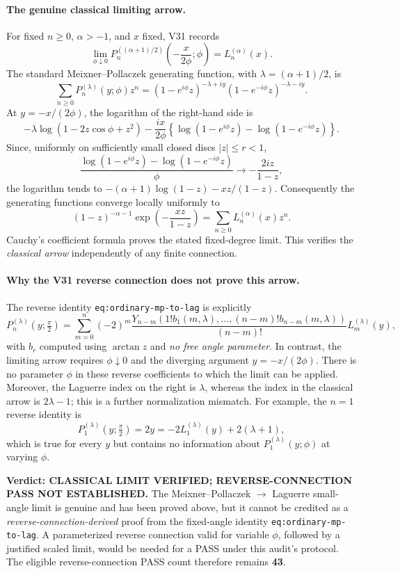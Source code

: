 \documentclass[11pt]{article}
\begin{document}
\paragraph{The genuine classical limiting arrow.}
For fixed $n\ge0$, $\alpha>-1$, and $x$ fixed, V31 records
\[
\lim_{\phi\downarrow0}P_n^{((\alpha+1)/2)}
 \left(-\frac{x}{2\phi};\phi\right)=L_n^{(\alpha)}(x).
\]
The standard Meixner--Pollaczek generating function, with
$\lambda=(\alpha+1)/2$, is
\[
\sum_{n\ge0}P_n^{(\lambda)}(y;\phi)z^n
 =(1-e^{i\phi}z)^{-\lambda+iy}
  (1-e^{-i\phi}z)^{-\lambda-iy}.
\]
At $y=-x/(2\phi)$, the logarithm of the right-hand side is
\[
-\lambda\log(1-2z\cos\phi+z^2)
-\frac{ix}{2\phi}
 \left\{\log(1-e^{i\phi}z)-\log(1-e^{-i\phi}z)\right\}.
\]
Since, uniformly on sufficiently small closed discs $|z|\le r<1$,
\[
\frac{\log(1-e^{i\phi}z)-\log(1-e^{-i\phi}z)}{\phi}
\longrightarrow -\frac{2iz}{1-z},
\]
the logarithm tends to
$-(\alpha+1)\log(1-z)-xz/(1-z)$.
Consequently the generating functions converge locally uniformly to
\[
(1-z)^{-\alpha-1}\exp\!\left(-\frac{xz}{1-z}\right)
=\sum_{n\ge0}L_n^{(\alpha)}(x)z^n.
\]
Cauchy's coefficient formula proves the stated fixed-degree limit.
This verifies the \emph{classical arrow} independently of any finite
connection.

\paragraph{Why the V31 reverse connection does not prove this arrow.}
The reverse identity \texttt{eq:ordinary-mp-to-lag} is explicitly
\[
P_n^{(\lambda)}(y;\tfrac\pi2)
 =\sum_{m=0}^n(-2)^m\frac{Y_{n-m}
 (1!b_1(m,\lambda),\ldots,(n-m)!b_{n-m}(m,\lambda))}{(n-m)!}
 L_m^{(\lambda)}(y),
\]
with $b_r$ computed using $\arctan z$ and \emph{no free angle
parameter}.  In contrast, the limiting arrow requires
$\phi\downarrow0$ and the diverging argument
$y=-x/(2\phi)$.  There is no parameter $\phi$ in these reverse
coefficients to which the limit can be applied.  Moreover, the
Laguerre index on the right is $\lambda$, whereas the index in the
classical arrow is $2\lambda-1$; this is a further normalization
mismatch.  For example, the $n=1$ reverse identity is
\[
P_1^{(\lambda)}(y;\tfrac\pi2)=2y
 =-2L_1^{(\lambda)}(y)+2(\lambda+1),
\]
which is true for every $y$ but contains no information about
$P_1^{(\lambda)}(y;\phi)$ at varying $\phi$.

\noindent\textbf{Verdict: CLASSICAL LIMIT VERIFIED; REVERSE-CONNECTION
PASS NOT ESTABLISHED.}  The Meixner--Pollaczek $\to$ Laguerre
small-angle limit is genuine and has been proved above, but it cannot
be credited as a \emph{reverse-connection-derived} proof from the
fixed-angle identity \texttt{eq:ordinary-mp-to-lag}.  A parameterized
reverse connection valid for variable $\phi$, followed by a justified
scaled limit, would be needed for a PASS under this audit's protocol.
The eligible reverse-connection PASS count therefore remains
\textbf{43}.
\end{document}
